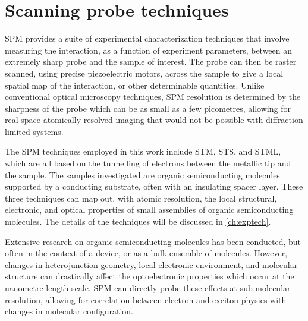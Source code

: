 \section{Scanning probe techniques}


\Acf{SPM} provides a suite of experimental characterization techniques that involve measuring the interaction, as a function of experiment parameters, between an extremely sharp probe and the sample of interest. The probe can then be raster scanned, using precise piezoelectric motors, across the sample to give a local spatial map of the interaction, or other determinable quantities. Unlike conventional optical microscopy techniques, \ac{SPM} resolution is determined by the sharpness of the probe which can be as small as a few picometres, allowing for real-space atomically resolved imaging that would not be possible with diffraction limited systems.

The \ac{SPM} techniques employed in this work include \ac{STM}, \ac{STS}, and \ac{STML}, which are all based on the tunnelling of electrons between the metallic tip and the sample. The samples investigated are organic semiconducting molecules supported by a conducting substrate, often with an insulating spacer layer. These three techniques can map out, with atomic resolution, the local structural, electronic, and optical properties of small assemblies of organic semiconducting molecules. The details of the techniques will be discussed in \autoref{ch:exptech}.

Extensive research on organic semiconducting molecules has been conducted, but often in the context of a device, or as a bulk ensemble of molecules. However, changes in heterojunction geometry, local electronic environment, and molecular structure can drastically affect the optoelectronic properties which occur at the nanometre length scale. \ac{SPM} can directly probe these effects at sub-molecular resolution, allowing for correlation between electron and exciton physics with changes in molecular configuration.

